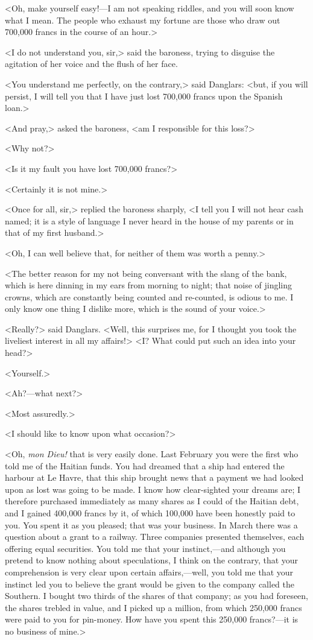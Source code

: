  <Oh, make yourself easy!—I am not speaking riddles, and you will soon know what I mean. The people who exhaust my fortune are those who draw out 700,000 francs in the course of an hour.> 

 <I do not understand you, sir,> said the baroness, trying to disguise the agitation of her voice and the flush of her face. 

 <You understand me perfectly, on the contrary,> said Danglars: <but, if you will persist, I will tell you that I have just lost 700,000 francs upon the Spanish loan.> 

 <And pray,> asked the baroness, <am I responsible for this loss?> 

 <Why not?> 

 <Is it my fault you have lost 700,000 francs?> 

 <Certainly it is not mine.> 

 <Once for all, sir,> replied the baroness sharply, <I tell you I will not hear cash named; it is a style of language I never heard in the house of my parents or in that of my first husband.> 

 <Oh, I can well believe that, for neither of them was worth a penny.> 

 <The better reason for my not being conversant with the slang of the bank, which is here dinning in my ears from morning to night; that noise of jingling crowns, which are constantly being counted and re-counted, is odious to me. I only know one thing I dislike more, which is the sound of your voice.> 

 <Really?> said Danglars. <Well, this surprises me, for I thought you took the liveliest interest in all my affairs!>  <I? What could put such an idea into your head?> 

 <Yourself.> 

 <Ah?—what next?> 

 <Most assuredly.> 

 <I should like to know upon what occasion?> 

 <Oh, \textit{mon Dieu!} that is very easily done. Last February you were the first who told me of the Haitian funds. You had dreamed that a ship had entered the harbour at Le Havre, that this ship brought news that a payment we had looked upon as lost was going to be made. I know how clear-sighted your dreams are; I therefore purchased immediately as many shares as I could of the Haitian debt, and I gained 400,000 francs by it, of which 100,000 have been honestly paid to you. You spent it as you pleased; that was your business. In March there was a question about a grant to a railway. Three companies presented themselves, each offering equal securities. You told me that your instinct,—and although you pretend to know nothing about speculations, I think on the contrary, that your comprehension is very clear upon certain affairs,—well, you told me that your instinct led you to believe the grant would be given to the company called the Southern. I bought two thirds of the shares of that company; as you had foreseen, the shares trebled in value, and I picked up a million, from which 250,000 francs were paid to you for pin-money. How have you spent this 250,000 francs?—it is no business of mine.> 

